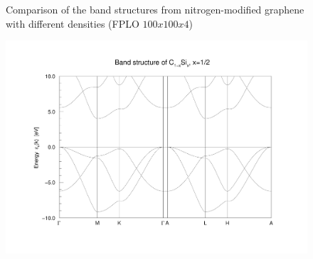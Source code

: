 \begin{figure}
\begin{minipage}[t]{0.3\textwidth}
					\end{minipage}															
					\caption{Comparison of the band structures from nitrogen-modified graphene with different densities (FPLO $100x100x4$)}
					\label{fig:NitrogenDensityComparisson}
				\end{figure}
				\begin{figure}
					\begin{minipage}[t]{0.9\textwidth}
						\includegraphics[width=\textwidth]{Results/Silicon/Silicon1/silicon1band.pdf}
					\end{minipage}
					\begin{minipage}[t]{0.9\textwidth}


\end{minipage}
\end{figure}
